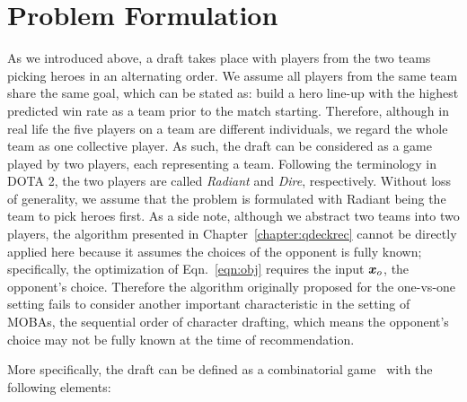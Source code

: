\section{Problem Formulation}\label{sec:probdef}
As we introduced above, a draft takes place with players from the two teams picking heroes in an alternating order. We assume all players from the same team share the same goal, which can be stated as: build a hero line-up with the highest predicted win rate as a team prior to the match starting. Therefore, although in real life the five players on a team are different individuals, we regard the whole team as one collective player. As such, the draft can be considered as a game played by two players, each representing a team.  Following the terminology in DOTA 2, the two players are called \textit{Radiant} and \textit{Dire}, respectively. Without loss of generality, we assume that the problem is formulated with Radiant being the team to pick heroes first. As a side note, although we abstract two teams into two players, the algorithm presented in Chapter~\ref{chapter:qdeckrec} cannot be directly applied here because it assumes the choices of the opponent is fully known; specifically, the optimization of Eqn.~\ref{eqn:obj} requires the input $\boldsymbol{x}_o$, the opponent's choice. Therefore the algorithm originally proposed for the one-vs-one setting fails to consider another important characteristic in the setting of MOBAs, the sequential order of character drafting, which means the opponent's choice may not be fully known at the time of recommendation.

More specifically, the draft can be defined as a combinatorial game~\cite{browne2012survey} with the following elements:

